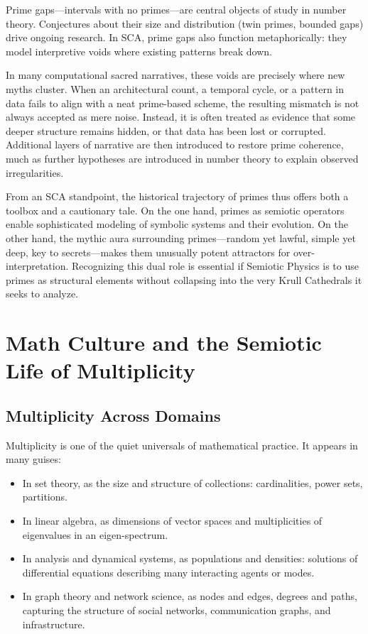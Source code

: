 \documentclass[12]{amsart}
\theoremstyle{plain}
\begin{document}
Prime gaps—intervals with no primes—are central objects of study in number theory. Conjectures about their size and distribution (twin primes, bounded gaps) drive ongoing research. In SCA, prime gaps also function metaphorically: they model interpretive voids where existing patterns break down.

In many computational sacred narratives, these voids are precisely where new myths cluster. When an architectural count, a temporal cycle, or a pattern in data fails to align with a neat prime-based scheme, the resulting mismatch is not always accepted as mere noise. Instead, it is often treated as evidence that some deeper structure remains hidden, or that data has been lost or corrupted. Additional layers of narrative are then introduced to restore prime coherence, much as further hypotheses are introduced in number theory to explain observed irregularities.

From an SCA standpoint, the historical trajectory of primes thus offers both a toolbox and a cautionary tale. On the one hand, primes as semiotic operators enable sophisticated modeling of symbolic systems and their evolution. On the other hand, the mythic aura surrounding primes—random yet lawful, simple yet deep, key to secrets—makes them unusually potent attractors for over-interpretation. Recognizing this dual role is essential if Semiotic Physics is to use primes as structural elements without collapsing into the very Krull Cathedrals it seeks to analyze.

\section{Math Culture and the Semiotic Life of Multiplicity}

\subsection{Multiplicity Across Domains}

Multiplicity is one of the quiet universals of mathematical practice. It appears in many guises:

\begin{itemize}
  \item In set theory, as the size and structure of collections: cardinalities, power sets, partitions.
  \item In linear algebra, as dimensions of vector spaces and multiplicities of eigenvalues in an eigen-spectrum.
  \item In analysis and dynamical systems, as populations and densities: solutions of differential equations describing many interacting agents or modes.
  \item In graph theory and network science, as nodes and edges, degrees and paths, capturing the structure of social networks, communication graphs, and infrastructure.
\end{itemize}
\end{document}
